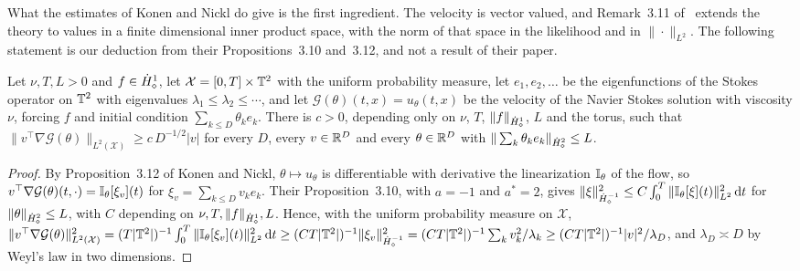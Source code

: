 What the estimates of Konen and Nickl do give is the first ingredient. The velocity is vector valued, and Remark~3.11 of~\cite{nicklwang2024} extends the theory to values in a finite dimensional inner product space, with the norm of that space in the likelihood and in $\|\cdot\|_{L^2}$. The following statement is our deduction from their Propositions~3.10 and~3.12, and not a result of their paper.

\begin{proposition}\label{prop:gs_ns}
Let $\nu,T,L>0$ and $f\in\dot H^{1}_\diamond$, let $\mathcal{X}=[0,T]\times\mathbb{T}^2$ with the uniform probability measure, let $e_1,e_2,\dots$ be the eigenfunctions of the Stokes operator on $\mathbb{T}^2$ with eigenvalues $\lambda_1\le\lambda_2\le\cdots$, and let $\mathcal{G}(\theta)(t,x)=u_\theta(t,x)$ be the velocity of the Navier Stokes solution with viscosity $\nu$, forcing $f$ and initial condition $\sum_{k\le D}\theta_ke_k$. There is $c>0$, depending only on $\nu$, $T$, $\|f\|_{\dot H^{1}_\diamond}$, $L$ and the torus, such that $\|v^\top\nabla\mathcal{G}(\theta)\|_{L^2(\mathcal{X})}\ge c\,D^{-1/2}|v|$ for every $D$, every $v\in\mathbb{R}^D$ and every $\theta\in\mathbb{R}^D$ with $\|\sum_k\theta_ke_k\|_{\dot H^{2}_\diamond}\le L$.
\end{proposition}

\begin{proof}
By Proposition~3.12 of Konen and Nickl, $\theta\mapsto u_\theta$ is differentiable with derivative the linearization $\mathbb{I}_\theta$ of the flow, so $v^\top\nabla\mathcal{G}(\theta)(t,\cdot)=\mathbb{I}_\theta[\xi_v](t)$ for $\xi_v=\sum_{k\le D}v_ke_k$. Their Proposition~3.10, with $a=-1$ and $a^*=2$, gives $\|\xi\|_{\dot H^{-1}_\diamond}^2\le C\int_0^T\|\mathbb{I}_\theta[\xi](t)\|_{L^2}^2\,\mathrm{d} t$ for $\|\theta\|_{\dot H^{2}_\diamond}\le L$, with $C$ depending on $\nu,T,\|f\|_{\dot H^{1}_\diamond},L$. Hence, with the uniform probability measure on $\mathcal{X}$, $\|v^\top\nabla\mathcal{G}(\theta)\|_{L^2(\mathcal{X})}^2=(T|\mathbb{T}^2|)^{-1}\int_0^T\|\mathbb{I}_\theta[\xi_v](t)\|_{L^2}^2\,\mathrm{d} t\ge(CT|\mathbb{T}^2|)^{-1}\|\xi_v\|_{\dot H^{-1}_\diamond}^2=(CT|\mathbb{T}^2|)^{-1}\sum_kv_k^2/\lambda_k\ge(CT|\mathbb{T}^2|)^{-1}|v|^2/\lambda_D$, and $\lambda_D\asymp D$ by Weyl's law in two dimensions.
\end{proof}

